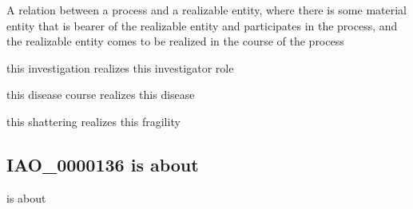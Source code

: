 \documentclass[letterpaper,10pt,english]{sphinxmanual}
\begin{document}
\begin{sphinxShadowBox}

\sphinxAtStartPar
{}
\end{sphinxShadowBox}

\begin{sphinxShadowBox}

\sphinxAtStartPar
A relation between a process and a realizable entity, where there is some material entity that is bearer of the realizable entity and participates in the process, and the realizable entity comes to be realized in the course of the process
\end{sphinxShadowBox}

\begin{sphinxShadowBox}

\sphinxAtStartPar
this investigation realizes this investigator role

\sphinxAtStartPar
this disease course realizes this disease

\sphinxAtStartPar
this shattering realizes this fragility
\end{sphinxShadowBox}

\begin{sphinxShadowBox}

\sphinxAtStartPar
{}
\end{sphinxShadowBox}
\begin{quote}

\ignorespaces \end{quote}


\subsection{IAO\_0000136 \sphinxhyphen{} is about}
\label{\detokenize{doc-IAO_0000136:iao-0000136-is-about}}\label{\detokenize{doc-IAO_0000136:index-0}}\label{\detokenize{doc-IAO_0000136::doc}}
\begin{sphinxShadowBox}

\sphinxAtStartPar
is about
\end{sphinxShadowBox}
\end{document}
